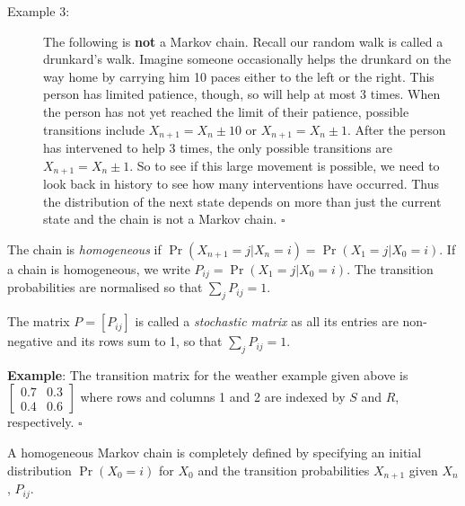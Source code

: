 \documentclass[11pt]{article}
\begin{document}
\begin{description}



\item[Example 3:]  The following is {\bf not} a Markov chain. Recall our random walk is called a drunkard's walk.  Imagine someone occasionally  helps the drunkard on the way home by carrying him 10 paces either to the left or the right.   This person has limited patience, though, so will help at most 3 times.  When the person has not  yet reached the limit of their patience, possible transitions include
$X_{n+1} = X_n \pm 10$ or $X_{n+1} = X_n \pm 1$.  After the person has intervened to help 3 times, the only possible transitions are $ X_{n+1}  = X_n \pm 1$.  So to see if this large movement is possible, we need to look back in history to see how many interventions have occurred.  Thus the distribution of the next state depends on more than just the current state and the chain is not a Markov chain. \hfill $\square$
\end{description}



The chain is {\em homogeneous} if $\Pr(X_{n+1} = j|X_n = i) = \Pr(X_1 = j|X_0 = i)$. If a chain is homogeneous, we write $P_{ij} = \Pr(X_1 = j|X_0 = i)$.  The transition probabilities are normalised so that $\sum_j P_{ij} = 1$. 

The matrix $P = [P_{ij}]$ is called a {\em stochastic matrix} as all its entries  are non-negative and its rows sum to 1, so that $\sum_j P_{ij} = 1$.


{\bf Example}: The transition matrix for the weather example given above is 
$\left[ \begin{array}{cc} 0.7 & 0.3 \\
0.4 & 0.6 \end{array} \right] $
where rows and columns 1 and 2 are indexed by $S$ and $R$, respectively. \hfill $\square$

A homogeneous Markov chain is completely defined  by specifying  an initial distribution $\Pr(X_0 = i)$ for $X_0$ and the transition probabilities $X_{n+1}$ given $X_n$, $P_{ij}$.  
 
 
\end{document}
